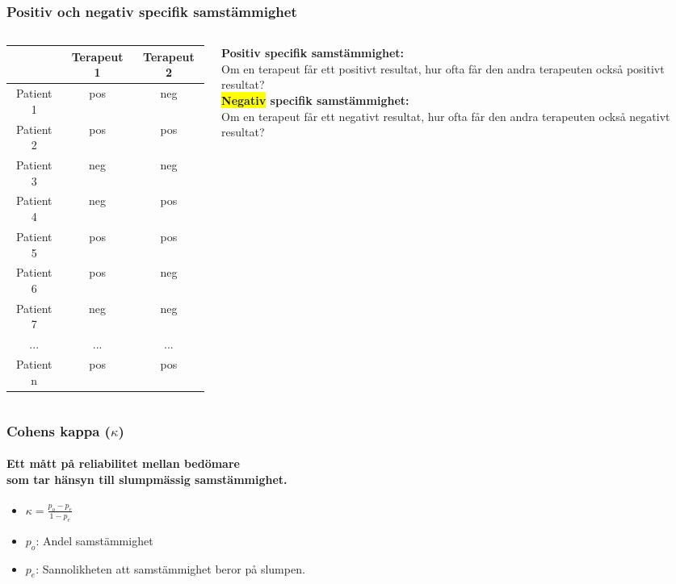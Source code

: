 \documentclass[aspectratio=169,12pt,handout,usenames,dvipsnames]{beamer}
\begin{document}
\begin{frame}
	\frametitle{Positiv och negativ specifik samstämmighet}
	\begin{columns}
		\begin{column}{0.5\textwidth}
			{
				\setlength\extrarowheight{2pt}
				\noindent\begin{tabular}{c|cc}
					& Terapeut 1  & Terapeut 2 \\
					\hline
					Patient 1 &pos&neg\\
					Patient 2 &pos&pos \\
					Patient 3 &\cellcolor{yellow}neg&\cellcolor{yellow}neg\\
					Patient 4 &neg&pos\\
					Patient 5 &pos&pos \\
					Patient 6 &pos&neg\\
					Patient 7 &\cellcolor{yellow}neg&\cellcolor{yellow}neg\\
					... &...&...\\		
					Patient n &pos&pos \\
				\end{tabular}
			}
		\end{column}
		\begin{column}{0.5\textwidth}
			
			{\bfseries Positiv specifik samstämmighet:}\\
			Om en terapeut får ett positivt resultat, hur ofta får den andra terapeuten också positivt resultat?\\[2ex]
			
			{\bfseries \colorbox{yellow}{Negativ} specifik samstämmighet:}\\
			Om en terapeut får ett negativt resultat, hur ofta får den andra terapeuten också negativt resultat?\\[2ex]
			
			
		\end{column}
	\end{columns}
\end{frame}
	
\begin{frame}
	\frametitle{Cohens kappa ($\kappa$)}
	\framesubtitle{Ett mått på reliabilitet mellan bedömare\\ som tar hänsyn till slumpmässig samstämmighet.}
	\begin{itemize}

		\item {\LARGE $\kappa = \frac{p_{o}-p_{e}} {1-p_{e}}$}\\[2ex]
		\item $p_{o}$: Andel samstämmighet
		\item $p_{e}$: Sannolikheten att samstämmighet beror på slumpen.
	\end{itemize}
\end{frame}
\end{document}
